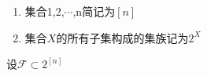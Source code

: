 
\begin{enumerate}{一些记号}
\item 集合{1,2,$\cdots$,n}简记为$[n]$
\item 集合$X$的所有子集构成的集族记为$2^{X}$
\end{enumerate}

\begin{definition}{}
设$\mathcal{F}\subset 2^{[n]}$
\end{definition}
